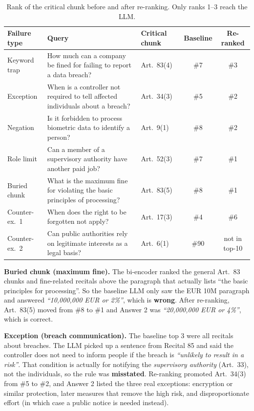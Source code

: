 \documentclass[11pt]{article}
\newcommand{\ans}[1]{\textit{``#1''}}
\begin{document}
\begin{table}[h]
\centering\small
\begin{tabularx}{\textwidth}{@{}l X l c c@{}}
\toprule
Failure type & Query & Critical chunk & Baseline & Re-ranked \\
\midrule
Keyword trap & How much can a company be fined for failing to report a data breach? & Art.\ 83(4) & \#7 & \#3 \\
Exception & When is a controller not required to tell affected individuals about a breach? & Art.\ 34(3) & \#5 & \#2 \\
Negation & Is it forbidden to process biometric data to identify a person? & Art.\ 9(1) & \#8 & \#2 \\
Role limit & Can a member of a supervisory authority have another paid job? & Art.\ 52(3) & \#7 & \#1 \\
Buried chunk & What is the maximum fine for violating the basic principles of processing? & Art.\ 83(5) & \#8 & \#1 \\
\midrule
Counter-ex.\ 1 & When does the right to be forgotten not apply? & Art.\ 17(3) & \#4 & \#6 \\
Counter-ex.\ 2 & Can public authorities rely on legitimate interests as a legal basis? & Art.\ 6(1) & \#90 & not in top-10 \\
\bottomrule
\end{tabularx}
\caption{Rank of the critical chunk before and after re-ranking. Only ranks 1--3 reach the LLM.}
\label{tab:ranks}
\end{table}

\vspace{-0.3cm}
\textbf{Buried chunk (maximum fine).} The bi-encoder ranked the general Art.\ 83 chunks and fine-related recitals
above the paragraph that actually lists ``the basic principles for processing''. So the baseline LLM only saw the
EUR 10M paragraph and answered \ans{10,000,000 EUR or 2\%}, which is \textbf{wrong}. After re-ranking, Art.\ 83(5)
moved from \#8 to \#1 and Answer 2 was \ans{20,000,000 EUR or 4\%}, which is correct.

\textbf{Exception (breach communication).} The baseline top 3 were all recitals about breaches. The LLM picked up a
sentence from Recital 85 and said the controller does not need to inform people if the breach is \ans{unlikely to
result in a risk}. That condition is actually for notifying the \emph{supervisory authority} (Art.\ 33), not the
individuals, so the rule was \textbf{misstated}. Re-ranking promoted Art.\ 34(3) from \#5 to \#2, and Answer 2 listed
the three real exceptions: encryption or similar protection, later measures that remove the high risk, and
disproportionate effort (in which case a public notice is needed instead).
\end{document}
